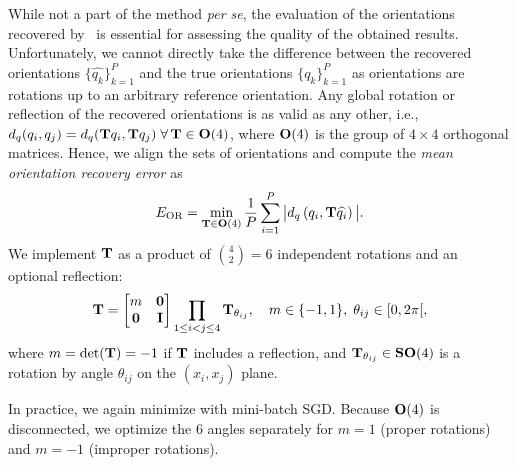While not a part of the method \textit{per se}, the evaluation of the orientations recovered by~ is essential for assessing the quality of the obtained results.
Unfortunately, we cannot directly take the difference between the recovered orientations $\{\widehat{q_k}\}_{k=1}^P$ and the true orientations $\{q_k\}_{k=1}^P$ as orientations are rotations up to an arbitrary reference orientation.
Any global rotation or reflection of the recovered orientations is as valid as any other, i.e., $d_q(q_i, q_j) = d_q(\mathbf{T} q_i , \mathbf{T} q_j) \; \forall \, \mathbf{T} \in \mathrm{\mathbf{O}}(4)$, where $\mathrm{\mathbf{O}}(4)$ is the group of $4 \times 4$ orthogonal matrices. %
Hence, we align the sets of orientations and compute the \textit{mean orientation recovery error} as
\begin{equation}
    E_\text{OR} = \min_{\mathbf{T} \in \mathrm{\mathbf{O}}(4)} \frac{1}{P} \sum_{i=1}^P \big| d_q\left( q_i, \mathbf{T} \widehat{q_i} \right) \big|.
    \label{eqn:orientation-recovery-error}
\end{equation}
We implement $\mathbf{T}$ as a product of $\binom{4}{2}=6$ independent rotations and an optional reflection:
\begin{equation*}
    \mathbf{T} =
    \begin{bmatrix}
        m & \mathbf{0} \\
        \mathbf{0} & \mathbf{I} \\
    \end{bmatrix}
    \prod_{1 \leq i < j \leq 4} \mathbf{T}_{\theta_{ij}},
    \quad m \in \{-1,1\}, \; \theta_{ij} \in [0, 2\pi[,
\end{equation*}
where $m = \det(\mathbf{T}) = -1$ if $\mathbf{T}$ includes a reflection, and $\mathbf{T}_{\theta_{ij}} \in \mathrm{\mathbf{SO}}(4)$ is a rotation by angle $\theta_{ij}$ on the $(x_i, x_j)$ plane.

 

In practice, we again minimize  with mini-batch SGD.
Because $\mathrm{\mathbf{O}}(4)$ is disconnected, we optimize the 6 angles separately for $m = 1$ (proper rotations) and $m = -1$ (improper rotations).

